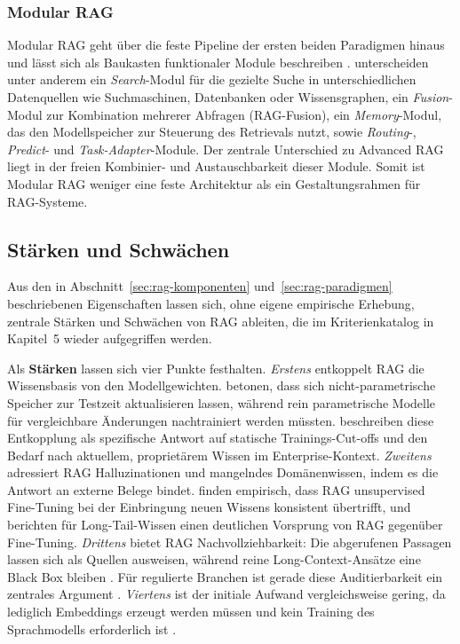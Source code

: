 \subsubsection{Modular RAG}
\label{sec:modular-rag}

Modular RAG geht über die feste Pipeline der ersten beiden Paradigmen hinaus und lässt sich als Baukasten funktionaler Module beschreiben \autocite[4]{Gao.2024}. \textcite[4f.]{Gao.2024} unterscheiden unter anderem ein \textit{Search}-Modul für die gezielte Suche in unterschiedlichen Datenquellen wie Suchmaschinen, Datenbanken oder Wissensgraphen, ein \textit{Fusion}-Modul zur Kombination mehrerer Abfragen (RAG-Fusion), ein \textit{Memory}-Modul, das den Modellspeicher zur Steuerung des Retrievals nutzt, sowie \textit{Routing}-, \textit{Predict}- und \textit{Task-Adapter}-Module. Der zentrale Unterschied zu Advanced RAG liegt in der freien Kombinier- und Austauschbarkeit dieser Module. Somit ist Modular RAG weniger eine feste Architektur als ein Gestaltungsrahmen für RAG-Systeme.

\subsection{Stärken und Schwächen}
\label{sec:rag-swot}

Aus den in Abschnitt~\ref{sec:rag-komponenten} und~\ref{sec:rag-paradigmen} beschriebenen Eigenschaften lassen sich, ohne eigene empirische Erhebung, zentrale Stärken und Schwächen von RAG ableiten, die im Kriterienkatalog in Kapitel~5 wieder aufgegriffen werden.

Als \textbf{Stärken} lassen sich vier Punkte festhalten. \textit{Erstens} entkoppelt RAG die Wissensbasis von den Modellgewichten. 
\textcite[7]{Lewis.2020} betonen, dass sich nicht-parametrische Speicher zur Testzeit aktualisieren lassen, während rein parametrische Modelle für vergleichbare Änderungen nachtrainiert werden müssten.
\textcite[3]{Karakurt.2026} beschreiben diese Entkopplung als spezifische Antwort auf statische Trainings-Cut-offs und den Bedarf nach aktuellem, proprietärem Wissen im Enterprise-Kontext. \textit{Zweitens} adressiert RAG Halluzinationen und mangelndes Domänenwissen, indem es die Antwort an externe Belege bindet.
\textcite[1]{Ovadia.2024} finden empirisch, dass RAG unsupervised Fine-Tuning bei der Einbringung neuen Wissens konsistent übertrifft, und 
\textcite[1f.]{Soudani.2024} berichten für Long-Tail-Wissen einen deutlichen Vorsprung von RAG gegenüber Fine-Tuning. \textit{Drittens} bietet RAG Nachvollziehbarkeit: Die abgerufenen Passagen lassen sich als Quellen ausweisen, während reine Long-Context-Ansätze eine Black Box bleiben \autocite[14]{Gao.2024}. 
Für regulierte Branchen ist gerade diese Auditierbarkeit ein zentrales Argument \autocite[20]{Karakurt.2026}.
\textit{Viertens} ist der initiale Aufwand vergleichsweise gering, da lediglich Embeddings erzeugt werden müssen und kein Training des Sprachmodells erforderlich ist \autocite[29]{Balaguer.2024}.

